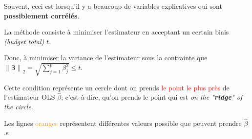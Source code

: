 \documentclass[10pt, french]{article}
\newcommand{\norm}[1]{\left\lVert#1\right\rVert}
\begin{document}
\begin{multicols*}{3}
Souvent, ceci est lorsqu'il y a beaucoup de variables explicatives qui sont \textbf{possiblement corrélés}.

La méthode consiste à minimiser l'estimateur en acceptant un certain biais \textit{(budget total)} $t$.

Donc, à minimiser la variance de l'estimateur sous la contrainte que $\norm{\bm{\beta}}_2 = \sqrt{\sum_{j = 1}^{p} \beta_{j}^{2}} \le t$.

Cette condition représente un cercle dont on prends \textcolor{red}{le point le plus près} de \textcolor{darkpastelpurple}{l'estimateur OLS $\widehat\beta$}; c'est-à-dire, qu'on prends le point qui est \textit{on the "\textbf{\color{red}ridge}" of the circle}.

Les lignes \textcolor{orange}{oranges} représentent différentes valeurs possible que peuvent prendre $\widehat\beta$.s


\end{multicols*}
\end{document}
